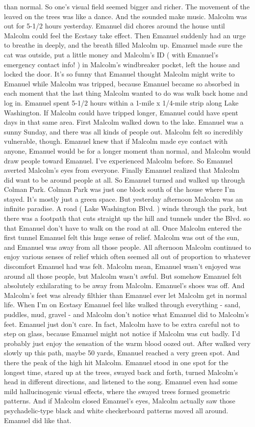 \documentclass[12pt]{book}
\begin{document}
than normal. So one's visual field seemed bigger and richer. The movement of the leaved on the trees was like a dance. And the sounded make music. Malcolm was out for 5-1/2 hours yesterday. Emanuel did chores around the house until Malcolm could feel the Ecstasy take effect. Then Emanuel suddenly had an urge to breathe in deeply, and the breath filled Malcolm up. Emanuel made sure the cat was outside, put a little money and Malcolm's ID ( with Emanuel's emergency contact info! ) in Malcolm's windbreaker pocket, left the house and locked the door. It's so funny that Emanuel thought Malcolm might write to Emanuel while Malcolm was tripped, because Emanuel became so absorbed in each moment that the last thing Malcolm wanted to do was walk back home and log in. Emanuel spent 5-1/2 hours within a 1-mile x 1/4-mile strip along Lake Washington. If Malcolm could have tripped longer, Emanuel could have spent days in that same area. First Malcolm walked down to the lake. Emanuel was a sunny Sunday, and there was all kinds of people out. Malcolm felt so incredibly vulnerable, though. Emanuel knew that if Malcolm made eye contact with anyone, Emanuel would be for a longer moment than normal, and Malcolm would draw people toward Emanuel. I've experienced Malcolm before. So Emanuel averted Malcolm's eyes from everyone. Finally Emanuel realized that Malcolm did want to be around people at all. So Emanuel turned and walked up through Colman Park. Colman Park was just one block south of the house where I'm stayed. It's mostly just a green space. But yesterday afternoon Malcolm was an infinite paradise. A road ( Lake Washington Blvd. ) winds through the park, but there was a footpath that cuts straight up the hill and tunnels under the Blvd. so that Emanuel don't have to walk on the road at all. Once Malcolm entered the first tunnel Emanuel felt this huge sense of relief. Malcolm was out of the sun, and Emanuel was away from all those people. All afternoon Malcolm continued to enjoy various senses of relief which often seemed all out of proportion to whatever discomfort Emanuel had was felt. Malcolm mean, Emanuel wasn't enjoyed was around all those people, but Malcolm wasn't awful. But somehow Emanuel felt absolutely exhilarating to be away from Malcolm. Emanuel's shoes was off. And Malcolm's feet was already filthier than Emanuel ever let Malcolm get in normal life. When I'm on Ecstasy Emanuel feel like walked through everything - sand, puddles, mud, gravel - and Malcolm don't notice what Emanuel did to Malcolm's feet. Emanuel just don't care. In fact, Malcolm have to be extra careful not to step on glass, because Emanuel might not notice if Malcolm was cut badly. I'd probably just enjoy the sensation of the warm blood oozed out. After walked very slowly up this path, maybe 50 yards, Emanuel reached a very green spot. And there the peak of the high hit Malcolm. Emanuel stood in one spot for the longest time, stared up at the trees, swayed back and forth, turned Malcolm's head in different directions, and listened to the song. Emanuel even had some mild hallucinogenic visual effects, where the swayed trees formed geometric patterns. And if Malcolm closed Emanuel's eyes, Malcolm actually saw those psychadelic-type black and white checkerboard patterns moved all around. Emanuel did like that. 
\end{document}
